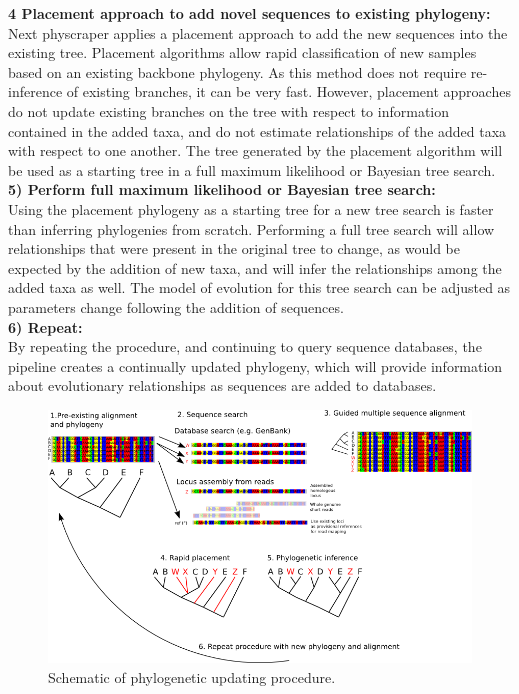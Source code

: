 \documentclass[a4paper,10pt]{article}
\begin{document}
\textbf{4 Placement approach to add novel sequences to existing phylogeny:}\\
Next physcraper applies a placement approach to add the new sequences into the existing tree. 
Placement algorithms allow rapid classification of new samples based on an existing backbone phylogeny.
As this method does not require re-inference of existing branches, it can be very fast.
However, placement approaches do not update existing branches on the tree with respect to information contained in the added taxa,
and do not estimate relationships of the added taxa with respect to one another.
The tree generated by the placement algorithm will be used as a starting tree in a full maximum likelihood or Bayesian tree search.\\

\textbf{5) Perform full maximum likelihood or Bayesian tree search:}\\
Using the placement phylogeny as a starting tree for a new tree search is faster than inferring phylogenies from scratch.
Performing a full tree search will allow relationships that were present in the original tree to change,
as would be expected by the addition of new taxa, and will infer the relationships among the added taxa as well.
The model of evolution for this tree search can be adjusted as parameters change following the addition of sequences.\\

\textbf{6) Repeat:}\\
By repeating the procedure, and continuing to query sequence databases, the pipeline creates a continually updated phylogeny, 
which will provide information about evolutionary relationships as
sequences are added to databases. 

\begin{figure}[!ht]
\begin{center}
\includegraphics[scale=.65]{physcraper_process.png}
\end{center}
\caption{
 Schematic of phylogenetic updating procedure.}
\label{Figure_label}
\end{figure}
\end{document}
